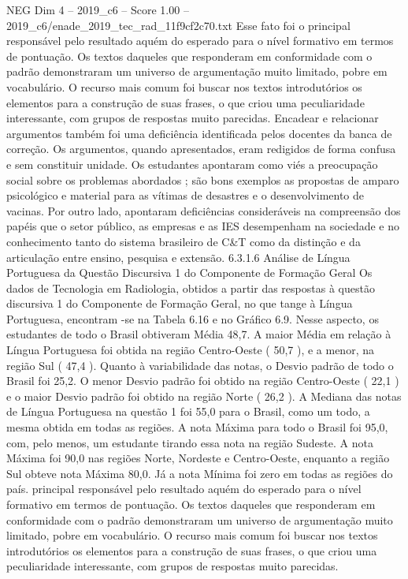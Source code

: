 \begin{textsample}{NEG Dim 4 – 2019\_c6 – Score 1.00 – 2019\_c6/enade\_2019\_tec\_rad\_11f9cf2c70.txt}
Esse fato foi o principal responsável pelo resultado aquém do esperado para o nível formativo em termos de pontuação.
Os textos daqueles que responderam em conformidade com o padrão demonstraram um universo de argumentação muito limitado, pobre em vocabulário.
O recurso mais comum foi buscar nos textos introdutórios os elementos para a construção de suas frases, o que criou uma peculiaridade interessante, com grupos de respostas muito parecidas.
Encadear e relacionar argumentos também foi uma deficiência identificada pelos docentes da banca de correção.
Os argumentos, quando apresentados, eram redigidos de forma confusa e sem constituir unidade.
Os estudantes apontaram como viés a preocupação social sobre os problemas abordados ; são bons exemplos as propostas de amparo psicológico e material para as vítimas de desastres e o desenvolvimento de vacinas.
Por outro lado, apontaram deficiências consideráveis na compreensão dos papéis que o setor público, as empresas e as IES desempenham na sociedade e no conhecimento tanto do sistema brasileiro de C\&T como da distinção e da articulação entre ensino, pesquisa e extensão. 6.3.1.6 Análise de Língua Portuguesa da Questão Discursiva 1 do Componente de Formação Geral Os dados de Tecnologia em Radiologia, obtidos a partir das respostas à questão discursiva 1 do Componente de Formação Geral, no que tange à Língua Portuguesa, encontram -se na Tabela 6.16 e no Gráfico 6.9.
Nesse aspecto, os estudantes de todo o Brasil obtiveram Média 48,7.
A maior Média em relação à Língua Portuguesa foi obtida na região Centro-Oeste ( 50,7 ), e a menor, na região Sul ( 47,4 ).
Quanto à variabilidade das notas, o Desvio padrão de todo o Brasil foi 25,2.
O menor Desvio padrão foi obtido na região Centro-Oeste ( 22,1 ) e o maior Desvio padrão foi obtido na região Norte ( 26,2 ).
A Mediana das notas de Língua Portuguesa na questão 1 foi 55,0 para o Brasil, como um todo, a mesma obtida em todas as regiões.
A nota Máxima para todo o Brasil foi 95,0, com, pelo menos, um estudante tirando essa nota na região Sudeste.
A nota Máxima foi 90,0 nas regiões Norte, Nordeste e Centro-Oeste, enquanto a região Sul obteve nota Máxima 80,0.
Já a nota Mínima foi zero em todas as regiões do país. principal responsável pelo resultado aquém do esperado para o nível formativo em termos de pontuação.
Os textos daqueles que responderam em conformidade com o padrão demonstraram um universo de argumentação muito limitado, pobre em vocabulário.
O recurso mais comum foi buscar nos textos introdutórios os elementos para a construção de suas frases, o que criou uma peculiaridade interessante, com grupos de respostas muito parecidas.

\end{textsample}
